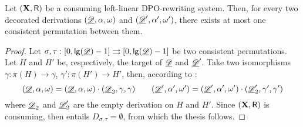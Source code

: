 \begin{corollary}\label{cor:unique}
Let $(\textbf {\textup{X}},\mathsf{R})$ be a consuming left-linear DPO-rewriting system. Then, for every two decorated derivations $(\underline{\mathscr{D}}, \alpha, \omega)$ and $(\underline{\mathscr{D}}', \alpha', \omega')$, there exists at most one consistent permutation between them.
\end{corollary}
\begin{proof}
Let $\sigma, \tau: [0, \mathsf{lg}(\underline{\mathscr{D}})-1]\rightrightarrows [0, \mathsf{lg}(\underline{\mathscr{D}})-1]$ be two consistent permutations. Let $H$  and $H'$ be, respectively, the target of $\underline{\mathscr{D}}$ and $\underline{\mathscr{D}}'$. Take two isomorphisms $\gamma:\pi(H)\to \gamma$, $\gamma':\pi(H')\to H'$, then, according to :
\[(\underline{\mathscr{D}}, \alpha, \omega)=(\underline{\mathscr{D}}, \alpha, \omega)\cdot (\underline{\mathscr{D}}_2, \gamma, \gamma) \qquad (\underline{\mathscr{D}}', \alpha', \omega')=(\underline{\mathscr{D}}', \alpha', \omega')\cdot (\underline{\mathscr{D}}'_2, \gamma', \gamma') \]
where $\underline{\mathscr{D}}_2$ and $\underline{\mathscr{D}}'_2$ are the empty derivation on $H$ and $H'$. Since $(\textbf {\textup{X}}, \mathsf{R})$ is consuming, then  entails $D_{\sigma, \tau}=\emptyset$, from which the thesis follows.
\end{proof}



